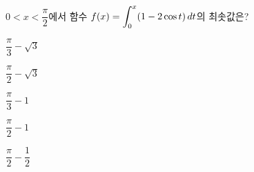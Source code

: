 \hspace*{2mm}\begin{minipage}[t]{\dimexpr\linewidth-2mm\relax}\vspace{0pt}
$0<x<\dfrac{\pi}{2}$에서 함수 $f(x)=\displaystyle\int_{0}^{x}(1-2\cos t)\mkern3mu dt$의 최솟값은?
\begin{choices32}{\rule[-3ex]{0pt}{8ex}$\dfrac{\pi}{3}-\sqrt{3}$}{\rule[-3ex]{0pt}{8ex}$\dfrac{\pi}{2}-\sqrt{3}$}{\rule[-3ex]{0pt}{8ex}$\dfrac{\pi}{3}-1$}{\rule[-3ex]{0pt}{8ex}$\dfrac{\pi}{2}-1$}{\rule[-3ex]{0pt}{8ex}$\dfrac{\pi}{2}-\dfrac{1}{2}$}\end{choices32}\end{minipage}
